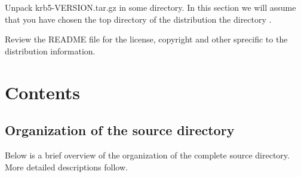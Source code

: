 \documentclass[letterpaper,10pt,english]{sphinxmanual}
\begin{document}
%
\begin{sphinxVerbatim}[commandchars=\\\{\}]
  
  
\end{sphinxVerbatim}

Unpack krb5-VERSION.tar.gz in some directory. In this section we will assume
that you have chosen the top directory of the distribution the directory
.

Review the README file for the license, copyright and other sprecific to the
distribution information.


\chapter{Contents}
\label{\detokenize{build/index:contents}}

\section{Organization of the source directory}
\label{\detokenize{build/directory_org::doc}}\label{\detokenize{build/directory_org:organization-of-the-source-directory}}
Below is a brief overview of the organization of the complete source
directory.  More detailed descriptions follow.
\end{document}
